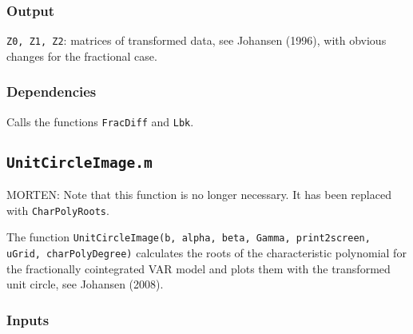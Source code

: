 \documentclass[12pt]{article}
\begin{document}
\subsubsection*{Output}

\texttt{Z0, Z1, Z2}: matrices of transformed data, see Johansen (1996), with obvious changes for the fractional case. 


\subsubsection*{Dependencies}

Calls the functions \texttt{FracDiff} and \texttt{Lbk}. 





\newpage

\subsection{\texttt{UnitCircleImage.m}}

MORTEN: Note that this function is no longer necessary. It has been replaced with \texttt{CharPolyRoots}.

The function \texttt{UnitCircleImage(b, alpha, beta, Gamma, print2screen, uGrid, charPolyDegree)} calculates the roots of the characteristic polynomial for the fractionally cointegrated VAR model and plots them with the transformed unit circle, see Johansen (2008).

\subsubsection*{Inputs}
\end{document}
